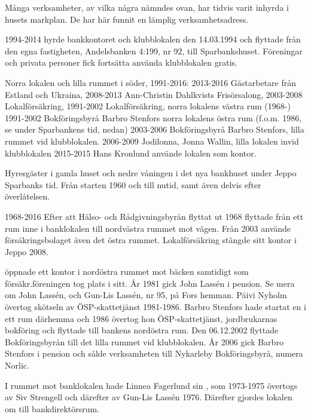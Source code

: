 
Många verksamheter, av vilka några nämndes ovan, har tidvis varit inhyrda i husets markplan. De har här funnit en lämplig verksamhetsadress.

1994-2014
 hyrde bankkontoret och klubblokalen den 14.03.1994 och flyttade från den egna fastigheten, Andelsbanken 4:199, nr 92, till Sparbankshuset. Föreningar och privata personer fick fortsätta använda klubblokalen gratis.

Norra lokalen och lilla rummet i söder, 1991-2016:
2013-2016   Gästarbetare från Estland och Ukraina,
2008-2013   Ann-Christin Dahlkvists Frisörsalong,
2003-2008   Lokalförsäkring,
1991-2002   Lokalförsäkring, norra lokalens västra rum (1968-)
1991-2002   Bokföringsbyrå Barbro Stenfors norra lokalens	östra rum (f.o.m. 1986, se under Sparbankens tid, nedan)
2003-2006   Bokföringsbyrå Barbro Stenfors, lilla rummet vid klubblokalen.
2006-2009   Jodilonna, Jonna Wallin, lilla lokalen invid klubblokalen
2015-2015   Hans Kronlund använde lokalen som kontor.

Hyresgäster i gamla huset och nedre våningen i det nya bankhuset under Jeppo Sparbanks tid. Från starten 1960 och till nutid, samt även delvis efter överlåtelsen.


1968-2016
Efter att Hälso- och Rådgivningsbyrån flyttat ut 1968 flyttade  från ett rum inne i banklokalen till nordvästra rummet mot vägen. Från 2003 använde försäkringsbolaget även det östra rummet.	Lokalförsäkring stängde sitt kontor i Jeppo 2008.

 öppnade ett kontor i nordöstra rummet mot bäcken samtidigt som försäkr.föreningen tog plats i sitt. År 1981 gick John Lassén i pension. Se mera om John Lassén, och Gun-Lis Lassén, nr 95, på Fors hemman. Päivi Nyholm övertog skötseln av ÖSP-skattetjänst 1981-1986. Barbro Stenfors hade startat en  i ett rum därhemma och 1986 övertog hon ÖSP-skattetjänst, jordbrukarnas bokföring och flyttade till bankens nordöstra rum. Den 06.12.2002 flyttade Bokföringsbyrån till det lilla rummet vid klubblokalen. År 2006 gick Barbro Stenfors i pension och sålde verksamheten till Nykarleby Bokföringsbyrå, numera Norlic.

I rummet mot banklokalen hade Linnea Fagerlund sin , som 1973-1975 övertogs av Siv Strengell och därefter av Gun-Lis Lassén 1976. Därefter gjordes lokalen om till bankdirektörsrum.

